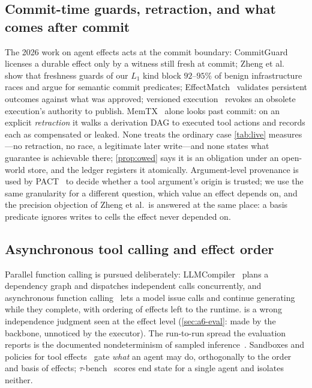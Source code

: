 \subsection{Commit-time guards, retraction, and what comes after commit}
\label{sec:related-residue}
The 2026 work on agent effects acts at the commit boundary:
CommitGuard~\cite{SantosGrueiro2026CommitGuard} licenses a durable effect
only by a witness still fresh at commit; Zheng et
al.~\cite{ZhengEtAl2026Stale} show that freshness guards of our $L_1$ kind
block $92$--$95\%$ of benign infrastructure races and argue for semantic
commit predicates; EffectMatch~\cite{ZhangEtAl2026EffectMatch} validates
persistent outcomes against what was approved; versioned
execution~\cite{ZhangEtAl2026Revisable} revokes an obsolete execution's
authority to publish. MemTX~\cite{LiEtAl2026MemTX} alone looks past
commit: on an explicit \emph{retraction} it walks a derivation DAG to
executed tool actions and records each as compensated or leaked. None treats the ordinary case \cref{tab:live}
measures---no retraction, no race, a legitimate later write---and none
states what guarantee is achievable there; \cref{prop:owed} says it is an
obligation under an open-world store, and the ledger registers it
atomically. Argument-level provenance is
used by PACT~\cite{FanEtAl2026PACT} to decide whether a tool argument's
origin is trusted; we use the same granularity for a different question,
which value an effect depends on, and the precision objection of Zheng et
al.\ is answered at the same place: a basis predicate ignores writes to
cells the effect never depended on.

\subsection{Asynchronous tool calling and effect order}
Parallel function calling is pursued deliberately:
LLMCompiler~\cite{KimEtAl2024LLMCompiler} plans a dependency graph and
dispatches independent calls concurrently, and asynchronous function
calling~\cite{GimEtAl2024AsyncLM,FutureAsync2026} lets a model issue calls
and continue generating while they complete, with ordering of effects left to
the runtime.  is a wrong independence judgment seen at the effect level
(\cref{sec:a6-eval}: made by the backbone, unnoticed by the executor). The run-to-run spread the
evaluation reports is the documented nondeterminism of sampled
inference~\cite{AtilEtAl2024Stability}. Sandboxes and policies for tool
effects~\cite{RuanEtAl2024ToolEmu,DebenedettiEtAl2024AgentDojo,ShiEtAl2025Progent,WangEtAl2025AgentSpec,WuEtAl2025IsolateGPT}
gate \emph{what} an agent may do, orthogonally to the order and basis of
effects; $\tau$-bench~\cite{YaoEtAl2024TauBench} scores end state for a
single agent and isolates neither.

